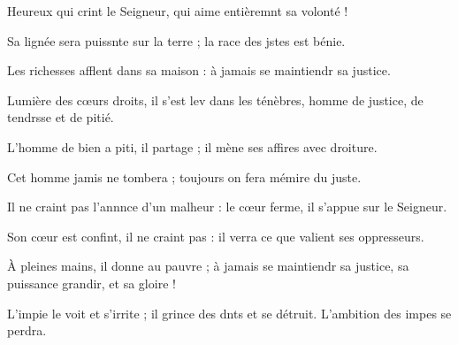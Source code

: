 \item Heureux qui crint le Seigneur,\psstar{} qui aime entièremnt sa volonté !
\item Sa lignée sera puissnte sur la terre ;\psstar{} la race des jstes est bénie.
\item Les richesses afflent dans sa maison :\psstar{} à jamais se maintiendr sa justice.
\item Lumière des cœurs droits, il s’est lev dans les ténèbres,\psstar{} homme de justice, de tendrsse et de pitié.
\item L’homme de bien a piti, il partage ;\psstar{} il mène ses affires avec droiture.
\item Cet homme jamis ne tombera ;\psstar{} toujours on fera mémire du juste.
\item Il ne craint pas l’annnce d’un malheur :\psstar{} le cœur ferme, il s’appue sur le Seigneur.
\item Son cœur est confint, il ne craint pas :\psstar{} il verra ce que valient ses oppresseurs.
\item À pleines mains, il donne au pauvre ;\pscross{} à jamais se maintiendr sa justice,\psstar{} sa puissance grandir, et sa gloire !
\item L’impie le voit et s’irrite ;\pscross{} il grince des dnts et se détruit.\psstar{} L’ambition des impes se perdra.